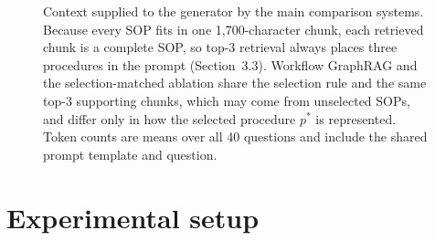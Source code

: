 \documentclass[preprint,10pt]{elsarticle}
\newif\ifshoworacle
\begin{document}
\begin{figure}[!htbp]
{}
\caption{Context supplied to the generator by the main comparison systems. Because every SOP fits in one 1,700-character chunk, each retrieved chunk is a complete SOP, so top-3 retrieval always places three procedures in the prompt (Section~3.3). Workflow GraphRAG and the selection-matched ablation share the selection rule and the same top-3 supporting chunks, which may come from unselected SOPs, and differ only in how the selected procedure $p^\ast$ is represented. Token counts are means over all 40 questions and include the shared prompt template and question.}
\label{fig:prompt}
\end{figure}

\section{Experimental setup}
\label{sec:setup}
\end{document}
